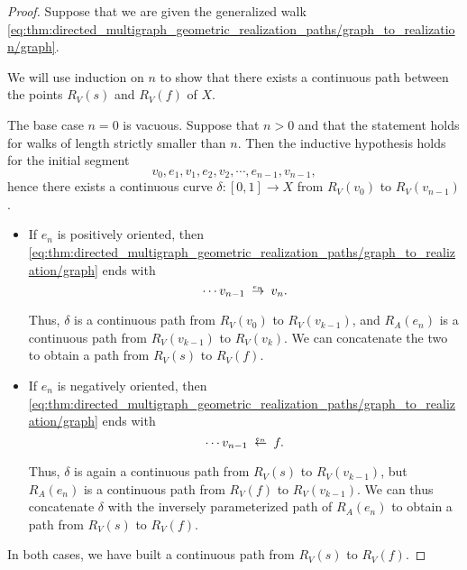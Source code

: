\begin{proof}
   Suppose that we are given the generalized walk \eqref{eq:thm:directed_multigraph_geometric_realization_paths/graph_to_realization/graph}.

  We will use induction on \( n \) to show that there exists a continuous path between the points \( R_V(s) \) and \( R_V(f)  \) of \( X \).

  The base case \( n = 0 \) is vacuous. Suppose that \( n > 0 \) and that the statement holds for walks of length strictly smaller than \( n \). Then the inductive hypothesis holds for the initial segment
  \begin{equation*}
    v_0, e_1, v_1, e_2, v_2, \cdots, e_{n-1}, v_{n-1},
  \end{equation*}
  hence there exists a continuous curve \( \delta: [0, 1] \to X \) from \( R_V(v_0) \) to \( R_V(v_{n-1}) \).

  \begin{itemize}
    \item If \( e_n \) is positively oriented, then \eqref{eq:thm:directed_multigraph_geometric_realization_paths/graph_to_realization/graph} ends with
    \begin{equation*}
      \cdots v_{n-1} \reloset{e_n} \to v_n.
    \end{equation*}

    Thus, \( \delta \) is a continuous path from \( R_V(v_0) \) to \( R_V(v_{k-1}) \), and \( R_A(e_n) \) is a continuous path from \( R_V(v_{k-1}) \) to \( R_V(v_k) \). We can concatenate the two to obtain a path from \( R_V(s)  \) to \( R_V(f) \).

    \item If \( e_n \) is negatively oriented, then \eqref{eq:thm:directed_multigraph_geometric_realization_paths/graph_to_realization/graph} ends with
    \begin{equation*}
      \cdots v_{n-1} \reloset{e_n} \leftarrow f.
    \end{equation*}

    Thus, \( \delta \) is again a continuous path from \( R_V(s) \) to \( R_V(v_{k-1}) \), but \( R_A(e_n) \) is a continuous path from \( R_V(f) \) to \( R_V(v_{k-1}) \). We can thus concatenate \( \delta \) with the inversely parameterized path of \( R_A(e_n) \) to obtain a path from \( R_V(s) \) to \( R_V(f) \).
  \end{itemize}

  In both cases, we have built a continuous path from \( R_V(s) \) to \( R_V(f)  \).


\end{proof}
